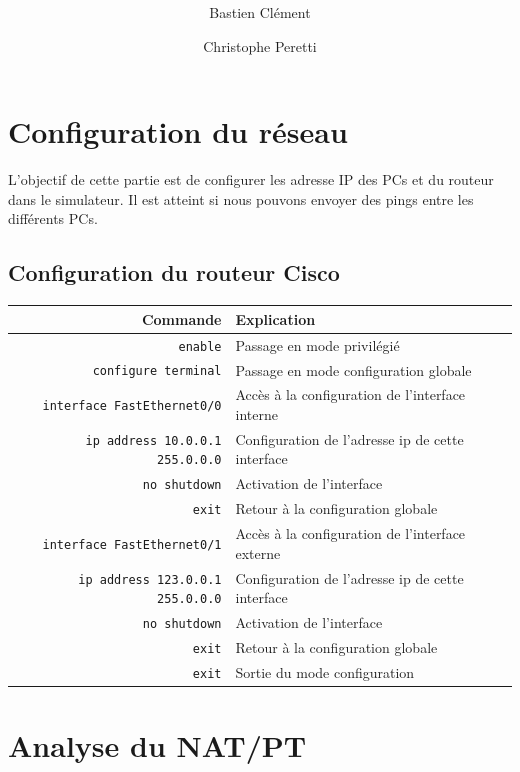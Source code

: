\documentclass[11pt,a4paper]{article}
\author{Bastien Clément \and Christophe Peretti}
\title{{\normalsize \doccourse} \\ \doctitle }
\begin{document}
\maketitle
\vspace{1em}

\section{Configuration du réseau}

L'objectif de cette partie est de configurer les adresse IP des PCs et du routeur dans le simulateur. Il est atteint si nous pouvons envoyer des pings entre les différents PCs.

\subsection{Configuration du routeur Cisco}
\begin{tabular}{|r|l|}
	\hline	
	\textbf{Commande} & \textbf{Explication}  \\
	\hline
	\texttt{enable} & Passage en mode privilégié\\
	\texttt{configure terminal} & Passage en mode configuration globale\\
	\hline
	\texttt{interface FastEthernet0/0} & Accès à la configuration de l'interface interne\\
	\texttt{ip address 10.0.0.1 255.0.0.0} & Configuration de l'adresse ip de cette interface\\
	\texttt{no shutdown} & Activation de l'interface \\
	\texttt{exit} & Retour à la configuration globale \\
	\hline
	\texttt{interface FastEthernet0/1} & Accès à la configuration de l'interface externe \\
	\texttt{ip address 123.0.0.1 255.0.0.0} & Configuration de l'adresse ip de cette interface \\
	\texttt{no shutdown} & Activation de l'interface \\
	\texttt{exit} & Retour à la configuration globale \\
	\hline
	\texttt{exit} & Sortie du mode configuration \\
	\hline
\end{tabular}


\section{Analyse du NAT/PT}
\end{document}
